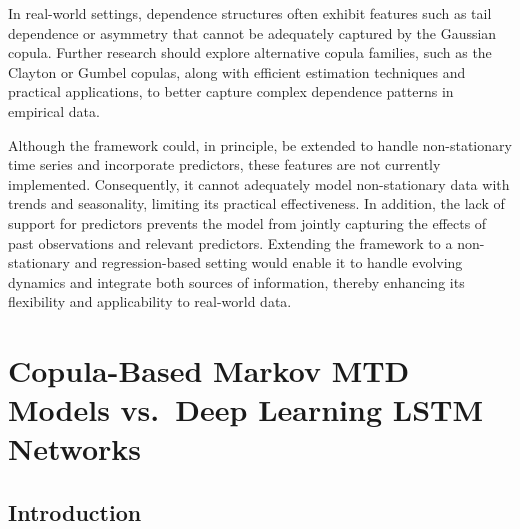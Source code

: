 \documentclass[
  letterpaper,
  double,
  12pt,
  1.0in]{beavtex}
\begin{document}
In real-world settings, dependence structures often exhibit features
such as tail dependence or asymmetry that cannot be adequately captured
by the Gaussian copula. Further research should explore alternative
copula families, such as the Clayton or Gumbel copulas, along with
efficient estimation techniques and practical applications, to better
capture complex dependence patterns in empirical data.

Although the framework could, in principle, be extended to handle
non-stationary time series and incorporate predictors, these features
are not currently implemented. Consequently, it cannot adequately model
non-stationary data with trends and seasonality, limiting its practical
effectiveness. In addition, the lack of support for predictors prevents
the model from jointly capturing the effects of past observations and
relevant predictors. Extending the framework to a non-stationary and
regression-based setting would enable it to handle evolving dynamics and
integrate both sources of information, thereby enhancing its flexibility
and applicability to real-world data.

\part{Copula-Based Markov MTD Models vs.~Deep Learning LSTM Networks}

\chapter{Introduction}\label{sec-ch3-intro}
\end{document}
